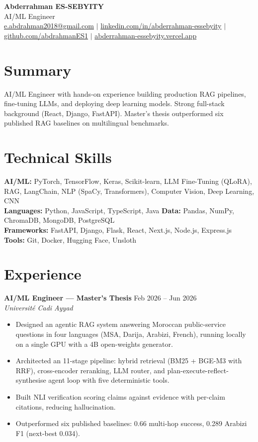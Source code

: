 \documentclass[11pt,a4paper]{article}
\begin{document}
\begin{center}
  {\Large\bfseries Abderrahman ES-SEBYITY} \\[3pt]
  {\normalsize AI/ML Engineer} \\[3pt]
  {\small
  \href{mailto:e.abdrahman2018@gmail.com}{e.abdrahman2018@gmail.com} $\vert$
  \href{https://linkedin.com/in/abderrahman-essebyity}{linkedin.com/in/abderrahman-essebyity} $\vert$
  \href{https://github.com/abdrahmanES1}{github.com/abdrahmanES1} $\vert$
  \href{https://abderrahman-essebyity.vercel.app}{abderrahman-essebyity.vercel.app}}
\end{center}

\section{Summary}
{\small AI/ML Engineer with hands-on experience building production RAG pipelines, fine-tuning LLMs, and deploying deep learning models. Strong full-stack background (React, Django, FastAPI). Master's thesis outperformed six published RAG baselines on multilingual benchmarks.}

\section{Technical Skills}
{\small
\textbf{AI/ML:} PyTorch, TensorFlow, Keras, Scikit-learn, LLM Fine-Tuning (QLoRA), RAG, LangChain, NLP (SpaCy, Transformers), Computer Vision, Deep Learning, CNN \\
\textbf{Languages:} Python, JavaScript, TypeScript, Java \quad
\textbf{Data:} Pandas, NumPy, ChromaDB, MongoDB, PostgreSQL \\
\textbf{Frameworks:} FastAPI, Django, Flask, React, Next.js, Node.js, Express.js \quad
\textbf{Tools:} Git, Docker, Hugging Face, Unsloth}

\section{Experience}

{\small
\textbf{AI/ML Engineer --- Master's Thesis} \hfill Feb 2026 -- Jun 2026 \\
\textit{Universit\'{e} Cadi Ayyad}}
\begin{itemize}[leftmargin=12pt]
  \item {\small Designed an agentic RAG system answering Moroccan public-service questions in four languages (MSA, Darija, Arabizi, French), running locally on a single GPU with a 4B open-weights generator.}
  \item {\small Architected an 11-stage pipeline: hybrid retrieval (BM25 + BGE-M3 with RRF), cross-encoder reranking, LLM router, and plan-execute-reflect-synthesise agent loop with five deterministic tools.}
  \item {\small Built NLI verification scoring claims against evidence with per-claim citations, reducing hallucination.}
  \item {\small Outperformed six published baselines: 0.66 multi-hop success, 0.289 Arabizi F1 (next-best 0.034).}
\end{itemize}
\end{document}

